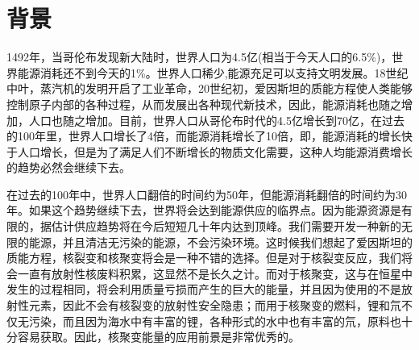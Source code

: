 \chapter{背景}
1492年，当哥伦布发现新大陆时，世界人口为4.5亿(相当于今天人口的6.5\%)，世界能源消耗还不到今天的1\%。世界人口稀少,能源充足可以支持文明发展。18世纪中叶，蒸汽机的发明开启了工业革命，20世纪初，爱因斯坦的质能方程使人类能够控制原子内部的各种过程，从而发展出各种现代新技术，因此，能源消耗也随之增加，人口也随之增加。目前，世界人口从哥伦布时代的4.5亿增长到70亿，在过去的100年里，世界人口增长了4倍，而能源消耗增长了10倍，即，能源消耗的增长快于人口增长，但是为了满足人们不断增长的物质文化需要，这种人均能源消费增长的趋势必然会继续下去。\cite{Lee2011NuclearFE}
\par 在过去的100年中，世界人口翻倍的时间约为50年，但能源消耗翻倍的时间约为30年。如果这个趋势继续下去，世界将会达到能源供应的临界点。因为能源资源是有限的，据估计供应趋势将在今后短短几十年内达到顶峰。我们需要开发一种新的无限的能源，并且清洁无污染的能源，不会污染环境。这时候我们想起了爱因斯坦的质能方程，核裂变和核聚变将会是一种不错的选择。但是对于核裂变反应，我们将会一直有放射性核废料积累，这显然不是长久之计。而对于核聚变，这与在恒星中发生的过程相同，将会利用质量亏损而产生的巨大的能量，并且因为使用的不是放射性元素，因此不会有核裂变的放射性安全隐患；而用于核聚变的燃料，锂和氘不仅无污染，而且因为海水中有丰富的锂，各种形式的水中也有丰富的氘，原料也十分容易获取。因此，核聚变能量的应用前景是非常优秀的。
